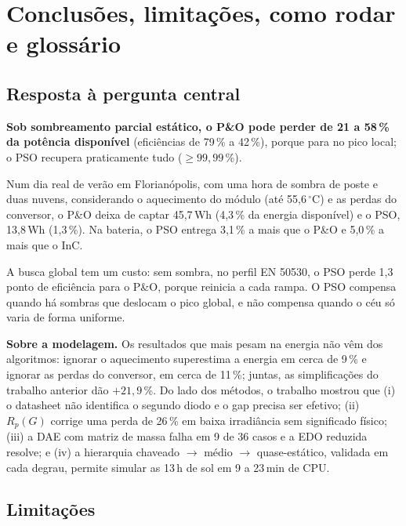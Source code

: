 \section{Conclus\~oes, limita\c{c}\~oes, como rodar e gloss\'ario}\label{sec:fim}

\subsection{Resposta \`a pergunta central}

\begin{resumo}
\textbf{Sob sombreamento parcial est\'atico, o P\&O pode perder de 21 a 58\,\% da pot\^encia dispon\'ivel} (efici\^encias de 79\,\% a 42\,\%), porque para no pico local; o PSO recupera praticamente tudo ($\ge99{,}99$\,\%).

Num dia real de ver\~ao em Florian\'opolis, com uma hora de sombra de poste e duas nuvens, considerando o aquecimento do m\'odulo (at\'e 55,6\,$^\circ$C) e as perdas do conversor, o P\&O deixa de captar 45,7\,Wh (4,3\,\% da energia
dispon\'ivel) e o PSO, 13,8\,Wh (1,3\,\%). Na bateria, o PSO entrega 3,1\,\% a mais que o P\&O e 5,0\,\% a mais que o InC.

A busca global tem um custo: sem sombra, no perfil EN 50530, o PSO perde 1,3 ponto de efici\^encia para o P\&O, porque reinicia a cada rampa. O PSO compensa quando h\'a sombras que deslocam o pico global, e n\~ao compensa quando o c\'eu s\'o varia de forma uniforme.
\end{resumo}

\textbf{Sobre a modelagem.} Os resultados que mais pesam na energia n\~ao v\^em dos algoritmos: ignorar o aquecimento superestima a energia em cerca de 9\,\% e ignorar as perdas do conversor, em cerca de 11\,\%; juntas, as simplifica\c{c}\~oes do trabalho anterior
d\~ao $+21{,}9$\,\%. Do lado dos m\'etodos, o trabalho mostrou que (i) o datasheet n\~ao identifica o segundo diodo e o gap precisa ser efetivo; (ii) $R_p(G)$ corrige uma perda de 26\,\% em baixa irradi\^ancia sem significado f\'isico; (iii) a DAE com matriz de massa falha em 9 de 36 casos e a EDO
reduzida resolve; e (iv) a hierarquia chaveado $\to$ m\'edio $\to$ quase-est\'atico, validada em cada degrau, permite simular as 13\,h de sol em 9 a 23\,min de CPU.

\subsection{Limita\c{c}\~oes}

